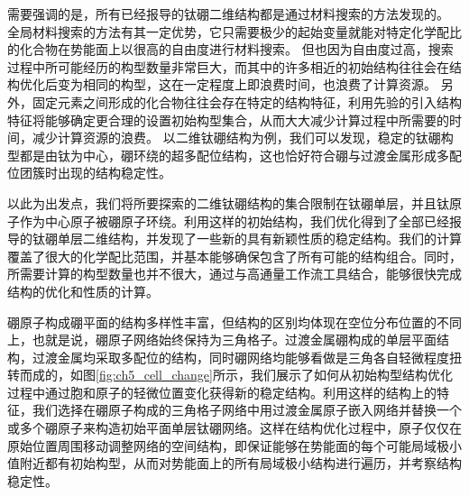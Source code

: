 需要强调的是，所有已经报导的钛硼二维结构都是通过材料搜索的方法发现的。
全局材料搜索的方法有其一定优势，它只需要极少的起始变量就能对特定化学配比的化合物在势能面上以很高的自由度进行材料搜索。
但也因为自由度过高，搜索过程中所可能经历的构型数量非常巨大，而其中的许多相近的初始结构往往会在结构优化后变为相同的构型，这在一定程度上即浪费时间，也浪费了计算资源。
另外，固定元素之间形成的化合物往往会存在特定的结构特征，利用先验的引入结构特征将能够确定更合理的设置初始构型集合，从而大大减少计算过程中所需要的时间，减少计算资源的浪费。
以二维钛硼结构为例，我们可以发现，稳定的钛硼构型都是由钛为中心，硼环绕的超多配位结构，这也恰好符合硼与过渡金属形成多配位团簇时出现的结构稳定性。

以此为出发点，我们将所要探索的二维钛硼结构的集合限制在钛硼单层，并且钛原子作为中心原子被硼原子环绕。利用这样的初始结构，我们优化得到了全部已经报导的钛硼单层二维结构，并发现了一些新的具有新颖性质的稳定结构。我们的计算覆盖了很大的化学配比范围，并基本能够确保包含了所有可能的结构组合。同时，所需要计算的构型数量也并不很大，通过与高通量工作流工具结合，能够很快完成结构的优化和性质的计算。

硼原子构成硼平面的结构多样性丰富，但结构的区别均体现在空位分布位置的不同上，也就是说，硼原子网络始终保持为三角格子。过渡金属硼构成的单层平面结构，过渡金属均采取多配位的结构，同时硼网络均能够看做是三角各自轻微程度扭转而成的，如图\ref{fig:ch5_cell_change}所示，我们展示了如何从初始构型结构优化过程中通过胞和原子的轻微位置变化获得新的稳定结构。利用这样的结构上的特征，我们选择在硼原子构成的三角格子网络中用过渡金属原子嵌入网络并替换一个或多个硼原子来构造初始平面单层钛硼网络。这样在结构优化过程中，原子仅仅在原始位置周围移动调整网络的空间结构，即保证能够在势能面的每个可能局域极小值附近都有初始构型，从而对势能面上的所有局域极小结构进行遍历，并考察结构稳定性。

